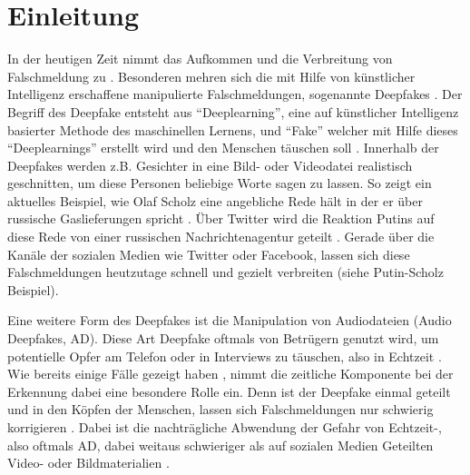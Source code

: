 \section{Einleitung}
In der heutigen Zeit nimmt das Aufkommen und die Verbreitung von Falschmeldung zu \citep[][]{Hancock2021}.
Besonderen mehren sich die mit Hilfe von künstlicher Intelligenz erschaffene manipulierte Falschmeldungen, sogenannte Deepfakes \citep[][]{Shahzad2022}.
Der Begriff des Deepfake entsteht aus ``Deeplearning'', eine auf künstlicher Intelligenz basierter Methode des maschinellen Lernens, und ``Fake'' welcher mit Hilfe dieses ``Deeplearnings'' erstellt wird und den Menschen täuschen soll \citep[][]{Mueller2022}.
Innerhalb der Deepfakes werden z.B. Gesichter in eine Bild- oder Videodatei realistisch geschnitten, um diese Personen beliebige Worte sagen zu lassen.
So zeigt ein aktuelles Beispiel, wie Olaf Scholz eine angebliche Rede hält in der er über russische Gaslieferungen spricht \citep[][]{Klasen2022}.
Über Twitter wird die Reaktion Putins auf diese Rede von einer russischen Nachrichtenagentur geteilt \citep[Vgl.][]{Klasen2022}.
Gerade über die Kanäle der sozialen Medien wie Twitter oder Facebook, lassen sich diese Falschmeldungen heutzutage schnell und gezielt verbreiten (siehe Putin-Scholz Beispiel).
\par
Eine weitere Form des Deepfakes ist die Manipulation von Audiodateien (Audio Deepfakes, AD).
Diese Art Deepfake oftmals von Betrügern genutzt wird, um potentielle Opfer am Telefon oder in Interviews zu täuschen, also in Echtzeit \citep[][]{Mueller2022}.
Wie bereits einige Fälle gezeigt haben \citep[Vgl.][]{Stupp2019}, nimmt die zeitliche Komponente bei der Erkennung dabei eine besondere Rolle ein.
Denn ist der Deepfake einmal geteilt und in den Köpfen der Menschen, lassen sich Falschmeldungen nur schwierig korrigieren \citep[][]{Hancock2021}.
Dabei ist die nachträgliche Abwendung der Gefahr von Echtzeit-, also oftmals AD, dabei weitaus schwieriger als auf sozialen Medien Geteilten Video- oder Bildmaterialien \citep[][]{Shahzad2022}.
\par
